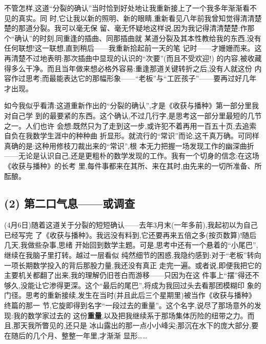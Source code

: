 不管怎样,这道“分裂的确认”当时恰到好处地让我重新接上了一个我多年渐渐看不见的真实。同
时,它让我以新的照明、新的眼睛,重新看见八年前我曾知觉得清清楚楚的那道分裂。我可以毫无保
留、毫无怀疑地这样说,因为我记得清清楚楚:作那个“确认”的时刻,同重逢的插曲、同那插曲就
某道分裂及其本性教给我的东西,没有任何联想!这一联想,直到稍后——我重新拾起前一天的笔
记时——才姗姗而来。这再清楚不过地表明:那次插曲中显现的认识的“次要”(而且不受欢迎!)
的内容,被收藏得多么干净。而且当年做来想必格外容易:重逢那道关键转折之后,没有人就这份
内容作过思考;而最能表达它的那幅形象——“老板”与“工匠孩子”——要再过好几年才出现。

如今我似乎看清:这道重新作出的“分裂的确认”,才是《收获与播种》第一部分里我对自己学
到的最要紧的东西。这个确认,不过几行字,是思考这一部分里最短的几节之一。\dmark{}人们也许
会想:既然只为了走到这一步,或许犯不着再用一百五十页,去追索自负在我数学生涯中的种种曲
折显形。就流行的“常识”而论,这千真万确。可同样真确的是:这种用修枝刀裁出来的“常识”,根
本无力把握一场发现工作的幽深曲折——无论是认识自己,还是更粗朴的数学发现的工作。我有一个切身的信念:在这场《收获与播种》的长考
里,每件事都来在其所、来在其时,由先来的一切所准备、所酝酿。

\subsection{(2) 第二口气息——或调查}   %


(4月6日)随着这道关于分裂的短短确认——去年3月末(一年多前),我起初以为自己已经写完
了《收获与播种》。我远没有料到,它还要再来五倍之多(按页数算)!随后几天,我做些杂事,思绪
开始回到数学主题。可是,思考中还有一个悬着的“小尾巴”,继续在我脑子里打转。越过一层看似
纯然细节的困惑,我隐约感到:对于“老板”转向一项长期数学投入的背后那股力量,我还没有真正
走完一遍。或者说,即便我把它的主要机关都翻了出来,我的理解仍旧苍白而游移——只因为在这
件事上“摆”得还不够久,没能让它渗得更深。这个“最后的尾巴”,将成为我回过头去看那团模糊印
象的门径。思考的重新接续,发生在当时(并且此后三个星期里)被当作《收获与播种》终篇的那一
节\dmark{},它旋即得到名字“一段过去的重量”。这个名字,说尽了那场意外的发现:我的数学家过去的
这份\textbf{重量},以及把我继续系于那场集体历险的纽带之力。而且,那天我所瞥见的,还只是
冰山露出的那一点小小峰尖;那沉在水下的庞大部分,要在随后的几个月、整整一年里,才渐渐
显形……

